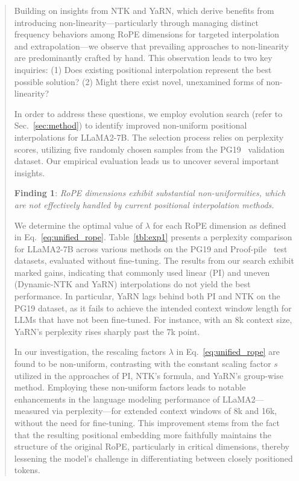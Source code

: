\begin{abstract}
Building on insights from NTK and YaRN, which derive benefits from introducing non-linearity—particularly through managing distinct frequency behaviors among RoPE dimensions for targeted interpolation and extrapolation—we observe that prevailing approaches to non-linearity are predominantly crafted by hand. This observation leads to two key inquiries: (1) Does existing positional interpolation represent the best possible solution? (2) Might there exist novel, unexamined forms of non-linearity?

In order to address these questions, we employ evolution search (refer to Sec.~\ref{sec:method}) to identify improved non-uniform positional interpolations for LLaMA2-7B. The selection process relies on perplexity scores, utilizing five randomly chosen samples from the PG19~\cite{pg19} validation dataset. Our empirical evaluation leads us to uncover several important insights.

\textbf{Finding 1}: \textit{RoPE dimensions exhibit substantial non-uniformities, which are not effectively handled by current positional interpolation methods.}

We determine the optimal value of $\lambda$ for each RoPE dimension as defined in Eq.~\ref{eq:unified_rope}. Table~\ref{tbl:exp1} presents a perplexity comparison for LLaMA2-7B across various methods on the PG19 and Proof-pile~\cite{proof-pile} test datasets, evaluated without fine-tuning. The results from our search exhibit marked gains, indicating that commonly used linear (PI) and uneven (Dynamic-NTK and YaRN) interpolations do not yield the best performance. In particular, YaRN lags behind both PI and NTK on the PG19 dataset, as it fails to achieve the intended context window length for LLMs that have not been fine-tuned. For instance, with an 8k context size, YaRN’s perplexity rises sharply past the 7k point.

In our investigation, the rescaling factors $\lambda$ in Eq.~\ref{eq:unified_rope} are found to be non-uniform, contrasting with the constant scaling factor $s$ utilized in the approaches of PI, NTK's formula, and YaRN's group-wise method. Employing these non-uniform factors leads to notable enhancements in the language modeling performance of LLaMA2—measured via perplexity—for extended context windows of 8k and 16k, without the need for fine-tuning. This improvement stems from the fact that the resulting positional embedding more faithfully maintains the structure of the original RoPE, particularly in critical dimensions, thereby lessening the model's challenge in differentiating between closely positioned tokens.


\end{abstract}
